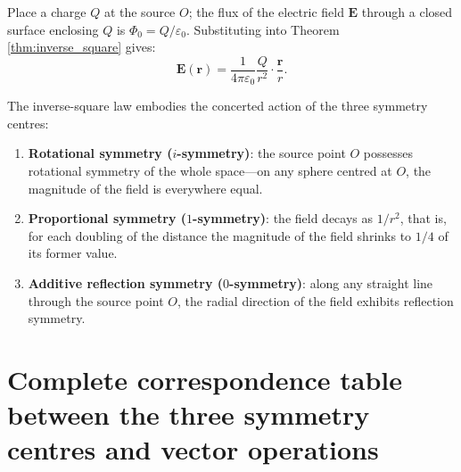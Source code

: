 \begin{example}
Place a charge $Q$ at the source $O$; the flux of the electric field $\mathbf{E}$ through a closed surface enclosing $Q$ is $\Phi_0 = Q/\varepsilon_0$. Substituting into Theorem \ref{thm:inverse_square} gives:
\[\mathbf{E}(\mathbf{r}) = \frac{1}{4\pi\varepsilon_0} \frac{Q}{r^2} \cdot \frac{\mathbf{r}}{r}.\]
\end{example}

\begin{remark}\label{rem:inverse_square_three_symmetries}
The inverse-square law embodies the concerted action of the three symmetry centres:
\begin{enumerate}[label=(\roman*)]
    \item \textbf{Rotational symmetry ($i$-symmetry)}: the source point $O$ possesses rotational symmetry of the whole space---on any sphere centred at $O$, the magnitude of the field is everywhere equal.
    \item \textbf{Proportional symmetry ($1$-symmetry)}: the field decays as $1/r^2$, that is, for each doubling of the distance the magnitude of the field shrinks to $1/4$ of its former value.
    \item \textbf{Additive reflection symmetry ($0$-symmetry)}: along any straight line through the source point $O$, the radial direction of the field exhibits reflection symmetry.
\end{enumerate}
\end{remark}

\section{\texorpdfstring{Complete correspondence table between the three symmetry centres and vector operations}{Complete correspondence table between the three symmetry centres and vector operations}}

